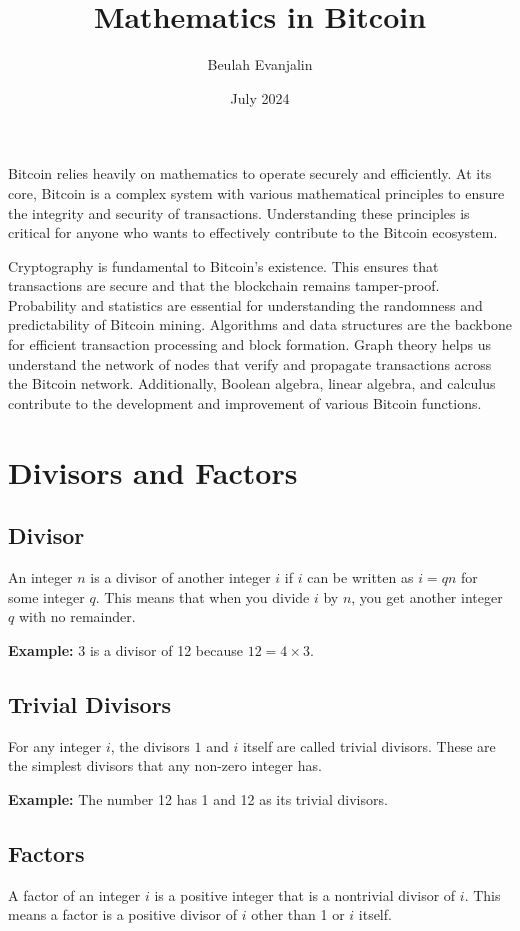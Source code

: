 \documentclass[11pt, letterpaper]{article}
\title{Mathematics in Bitcoin}
\author{Beulah Evanjalin}
\date{July 2024}
\begin{document}
\maketitle

Bitcoin relies heavily on mathematics to operate securely and efficiently. At its core, Bitcoin is a complex system with various mathematical principles to ensure the integrity and security of transactions. Understanding these principles is critical for anyone who wants to effectively contribute to the Bitcoin ecosystem.

Cryptography is fundamental to Bitcoin’s existence. This ensures that transactions are secure and that the blockchain remains tamper-proof. Probability and statistics are essential for understanding the randomness and predictability of Bitcoin mining. Algorithms and data structures are the backbone for efficient transaction processing and block formation. Graph theory helps us understand the network of nodes that verify and propagate transactions across the Bitcoin network. Additionally, Boolean algebra, linear algebra, and calculus contribute to the development and improvement of various Bitcoin functions.

\section{Divisors and Factors}

\subsection{Divisor}
An integer \( n \) is a divisor of another integer \( i \) if \( i \) can be written as \( i = qn \) for some integer \( q \). This means that when you divide \( i \) by \( n \), you get another integer \( q \) with no remainder.

\textbf{Example:} 3 is a divisor of 12 because \( 12 = 4 \times 3 \).

\subsection{Trivial Divisors}
For any integer \( i \), the divisors \( 1 \) and \( i \) itself are called trivial divisors. These are the simplest divisors that any non-zero integer has.

\textbf{Example:} The number 12 has 1 and 12 as its trivial divisors.

\subsection{Factors}
A factor of an integer \( i \) is a positive integer that is a nontrivial divisor of \( i \). This means a factor is a positive divisor of \( i \) other than 1 or \( i \) itself.
\end{document}
